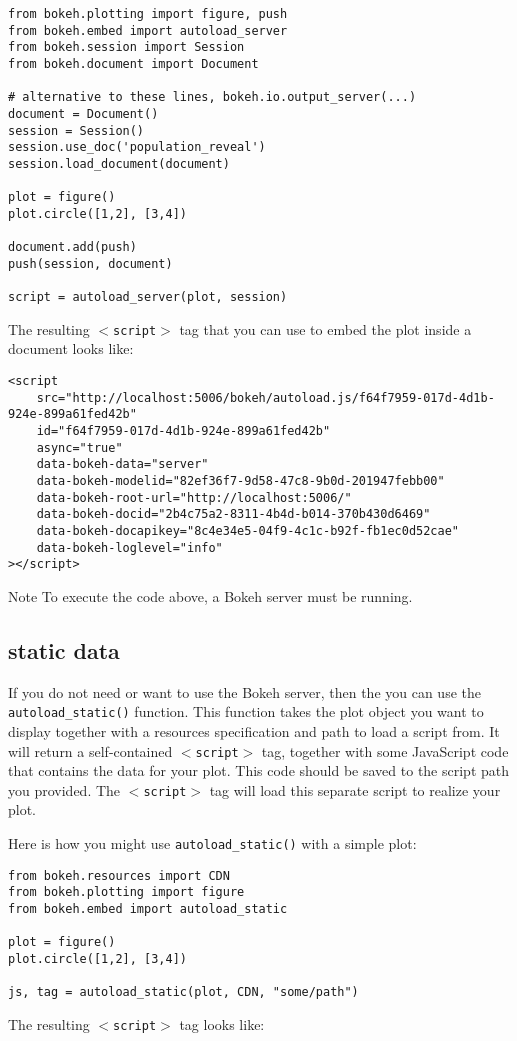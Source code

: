 \documentclass[a4paper,12pt]{article}
\begin{document}
\begin{framed}
\begin{verbatim}
from bokeh.plotting import figure, push
from bokeh.embed import autoload_server
from bokeh.session import Session
from bokeh.document import Document

# alternative to these lines, bokeh.io.output_server(...)
document = Document()
session = Session()
session.use_doc('population_reveal')
session.load_document(document)

plot = figure()
plot.circle([1,2], [3,4])

document.add(push)
push(session, document)

script = autoload_server(plot, session)
\end{verbatim}
\end{framed}
\newpage
The resulting $<$\texttt{script}$>$ tag that you can use to embed the plot inside a document looks like:
\begin{framed}
\begin{verbatim}
<script
    src="http://localhost:5006/bokeh/autoload.js/f64f7959-017d-4d1b-924e-899a61fed42b"
    id="f64f7959-017d-4d1b-924e-899a61fed42b"
    async="true"
    data-bokeh-data="server"
    data-bokeh-modelid="82ef36f7-9d58-47c8-9b0d-201947febb00"
    data-bokeh-root-url="http://localhost:5006/"
    data-bokeh-docid="2b4c75a2-8311-4b4d-b014-370b430d6469"
    data-bokeh-docapikey="8c4e34e5-04f9-4c1c-b92f-fb1ec0d52cae"
    data-bokeh-loglevel="info"
></script>
\end{verbatim}
\end{framed}
Note
To execute the code above, a Bokeh server must be running.
\subsection{static data}
If you do not need or want to use the Bokeh server, then the you can use the \texttt{autoload\_static()} function. This function takes the plot object you want to display together with a resources specification and path to load a script from. It will return a self-contained $<$\texttt{script}$>$ tag, together with some JavaScript code that contains the data for your plot. This code should be saved to the script path you provided. The $<$\texttt{script}$>$ tag will load this separate script to realize your plot.

Here is how you might use \texttt{autoload\_static()} with a simple plot:
\begin{framed}
	\begin{verbatim}
from bokeh.resources import CDN
from bokeh.plotting import figure
from bokeh.embed import autoload_static

plot = figure()
plot.circle([1,2], [3,4])

js, tag = autoload_static(plot, CDN, "some/path")
\end{verbatim}
\end{framed}
The resulting $<$\texttt{script}$>$ tag looks like:
\end{document}
